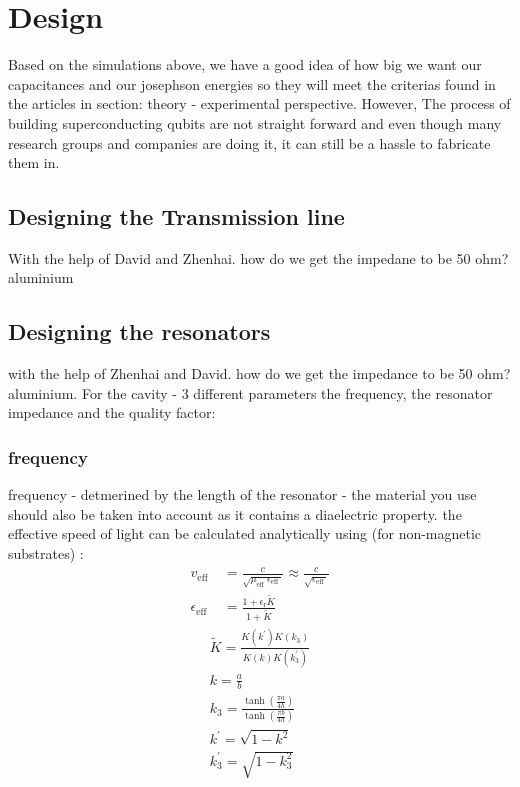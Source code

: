 \chapter{Design}

Based on the simulations above, we have a good idea of how big we want our capacitances and our josephson energies so they will meet the criterias found in the articles in section: theory - experimental perspective. However, The process of building superconducting qubits are not straight forward and even though many research groups and companies are doing it, it can still be a hassle to fabricate them in. 

\section{Designing the Transmission line}
With the help of David and Zhenhai. how do we get the impedane to be 50 ohm? aluminium
\section{Designing the resonators}
with the help of Zhenhai and David.
how do we get the impedance to be 50 ohm? aluminium. 
For the cavity - 3 different parameters the frequency, the resonator impedance and the quality factor: 
    \subsection{frequency}
        frequency - detmerined by the length of the resonator - the material you use should also be taken into account as it contains a diaelectric property. the effective speed of light can be calculated analytically using (for non-magnetic substrates) \cite{Schuster2007}: 
        \begin{equation}
            \begin{aligned}
                v_{\text {eff }} &=\frac{c}{\sqrt{\mu_{\text {eff }} \epsilon_{\text {eff }}}} \approx \frac{c}{\sqrt{\epsilon_{\text {eff }}}} \\
            \epsilon_{\mathrm{eff}} &=\frac{1+\epsilon_{\mathrm{r}} \widetilde{K}}{1+\widetilde{K}}
            \end{aligned}
        \end{equation}
        \begin{equation}
            \begin{gathered}
            \widetilde{K}=\frac{K\left(k^{\prime}\right) K\left(k_3\right)}{K(k) K\left(k_3^{\prime}\right)} \\
            k=\frac{a}{b} \\
            k_3=\frac{\tanh \left(\frac{\pi a}{4 h}\right)}{\tanh \left(\frac{\pi b}{4 h}\right)} \\
            k^{\prime}=\sqrt{1-k^2} \\
            k_3^{\prime}=\sqrt{1-k_3^2}
            \end{gathered}
        \end{equation}
